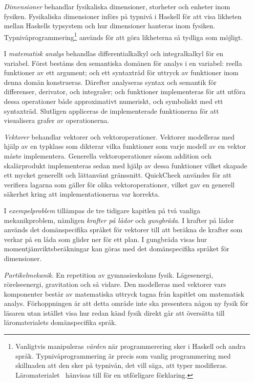 \textit{Dimensioner} behandlar fysikaliska dimensioner, storheter och enheter inom fysiken.
Fysikaliska dimensioner införs på typnivå i Haskell för att visa likheten mellan
Haskells typsystem och hur dimensioner hanteras inom fysiken.
Typnivåprogrammering\footnote{Vanligtvis manipuleras \textit{värden} när
programmerering sker i Haskell och andra språk. Typnivåprogrammering är precis som
vanlig programmering med skillnaden att den sker på typnivån, det vill säga, att
typer modifieras. Läromaterialet~\cite{LYAP} hänvisas till för en utförligare
förklaring.} används för att göra likheterna så tydliga som möjligt.

I \textit{matematisk analys} behandlas differentialkalkyl och
integralkalkyl för en variabel. Först bestäms den semantiska domänen
för analys i en variabel: reella funktioner av ett argument; och ett syntaxträd
för uttryck av funktioner inom denna domän konstrueras. Därefter
analyseras syntax och semantik för differenser, derivator, och
integraler; och funktioner implementeras för att utföra dessa
operationer både approximativt numeriskt, och symboliskt med ett
syntaxträd. Slutligen appliceras de implementerade funktionerna för
att visualisera grafer av operationerna.

\textit{Vektorer} behandlar vektorer och vektoroperationer. Vektorer modelleras
med hjälp av en typklass som dikterar vilka funktioner som varje
modell av en vektor måste implementera. Generella vektoroperationer såsom
addition och skalärprodukt implementeras sedan med hjälp av dessa funktioner
vilket skapade ett mycket generellt och lättanvänt gränssnitt. QuickCheck
användes för att verifiera lagarna som gäller för olika vektoroperationer,
vilket gav en generell säkerhet kring att implementationerna var korrekta.

I \textit{exempelproblem} tillämpas de tre tidigare kapitlen på två vanliga mekanikproblem, nämligen \textit{krafter på lådor} och \textit{gungbräda}. I krafter på lådor används det domänspecifika språket för vektorer till att beräkna de krafter som verkar på en låda som glider ner för ett plan. I gungbräda visas hur momentjämviktsberäkningar kan göras med det domänspecifika språket för dimensioner.

\textit{Partikelmekanik}. En repetition av gymnasieskolans fysik.
Lägesenergi, rörelseenergi, gravitation och så vidare. Den modelleras med vektorer vars
komponenter består av matematiska uttryck tagna från kapitlet om matematisk
analys. Förhoppningen är att detta område inte ska presentera någon ny fysik för
läsaren utan istället visa hur redan känd fysik direkt går att översätta till
läromaterialets domänspecifika språk.

